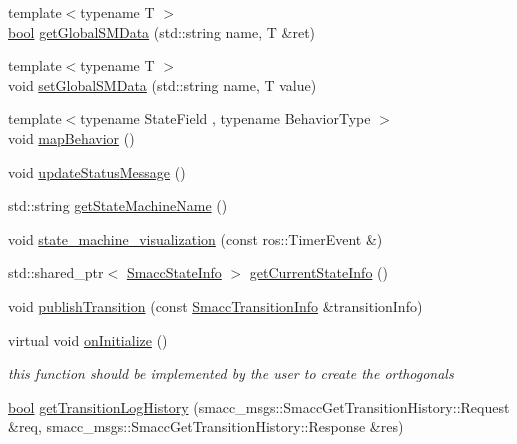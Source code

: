 \begin{DoxyCompactItemize}
\item 
{\footnotesize template$<$typename T $>$ }\\\hyperlink{classbool}{bool} \hyperlink{classsmacc_1_1ISmaccStateMachine_aeda2d6813c6c428bf318a5792e014b61}{get\+Global\+S\+M\+Data} (std\+::string name, T \&ret)
\item 
{\footnotesize template$<$typename T $>$ }\\void \hyperlink{classsmacc_1_1ISmaccStateMachine_a8588f9e580fbb95b53e2bd2ca3ff1f98}{set\+Global\+S\+M\+Data} (std\+::string name, T value)
\item 
{\footnotesize template$<$typename State\+Field , typename Behavior\+Type $>$ }\\void \hyperlink{classsmacc_1_1ISmaccStateMachine_acfb75233b79062cc7769ea751b7f320d}{map\+Behavior} ()
\item 
void \hyperlink{classsmacc_1_1ISmaccStateMachine_ad246a49015fadaeb0b1639d7ab99f7d0}{update\+Status\+Message} ()
\item 
std\+::string \hyperlink{classsmacc_1_1ISmaccStateMachine_a2d0b1742f17dd77d5df217153e8b5259}{get\+State\+Machine\+Name} ()
\item 
void \hyperlink{classsmacc_1_1ISmaccStateMachine_ac03029f770422d0ea77ea9856b8cb1a8}{state\+\_\+machine\+\_\+visualization} (const ros\+::\+Timer\+Event \&)
\item 
std\+::shared\+\_\+ptr$<$ \hyperlink{classsmacc_1_1introspection_1_1SmaccStateInfo}{Smacc\+State\+Info} $>$ \hyperlink{classsmacc_1_1ISmaccStateMachine_a4738679e8e5f7adab35e610dce0bfff7}{get\+Current\+State\+Info} ()
\item 
void \hyperlink{classsmacc_1_1ISmaccStateMachine_a06cc53c282c93692829b6efd28e315f4}{publish\+Transition} (const \hyperlink{structsmacc_1_1introspection_1_1SmaccTransitionInfo}{Smacc\+Transition\+Info} \&transition\+Info)
\item 
virtual void \hyperlink{classsmacc_1_1ISmaccStateMachine_ac2982c6c8283663e5e1e8a7c82f511ec}{on\+Initialize} ()
\begin{DoxyCompactList}\small\item\em this function should be implemented by the user to create the orthogonals \end{DoxyCompactList}\item 
\hyperlink{classbool}{bool} \hyperlink{classsmacc_1_1ISmaccStateMachine_a7508f4e398e263cdce308c8074bd5151}{get\+Transition\+Log\+History} (smacc\+\_\+msgs\+::\+Smacc\+Get\+Transition\+History\+::\+Request \&req, smacc\+\_\+msgs\+::\+Smacc\+Get\+Transition\+History\+::\+Response \&res)

\end{DoxyCompactItemize}
